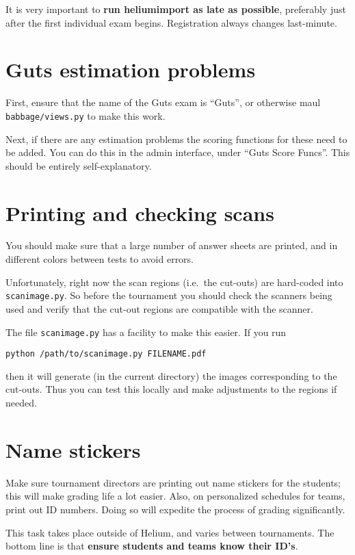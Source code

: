 It is very important to \textbf{run heliumimport as late as possible},
preferably just after the first individual exam begins.
Registration always changes last-minute.

\section{Guts estimation problems}
First, ensure that the name of the Guts exam is ``Guts'',
or otherwise maul \texttt{babbage/views.py} to make this work.

Next, if there are any estimation problems the scoring functions
for these need to be added.
You can do this in the admin interface, under ``Guts Score Funcs''.
This should be entirely self-explanatory.

\section{Printing and checking scans}
You should make sure that a large number of answer sheets are printed,
and in different colors between tests to avoid errors.

Unfortunately, right now the scan regions (i.e.\ the cut-outs)
are hard-coded into \verb+scanimage.py+.
So before the tournament you should check the scanners being used
and verify that the cut-out regions are compatible with the scanner.

The file \verb+scanimage.py+ has a facility to make this easier.
If you run
\begin{center}
\verb+python /path/to/scanimage.py FILENAME.pdf+
\end{center}
then it will generate (in the current directory)
the images corresponding to the cut-outs.
Thus you can test this locally and make adjustments to the regions if needed.
\section{Name stickers}
Make sure tournament directors are printing out name stickers for the students;
this will make grading life a lot easier.
Also, on personalized schedules for teams, print out ID numbers.
Doing so will expedite the process of grading significantly.

This task takes place outside of Helium, and varies between tournaments.
The bottom line is that \textbf{ensure students and teams know their ID's}.
